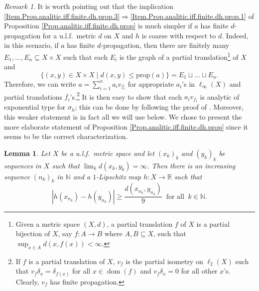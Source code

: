 \documentclass[11pt]{amsart}
\newcommand{\R}{\mathbb{R}}
\newcommand{\N}{\mathbb{N}}
\numberwithin{equation}{section}
\newtheorem{lemma}[theorem]{Lemma}
\theoremstyle{definition}
\theoremstyle{remark}
\newtheorem{remark}[theorem]{Remark}
\DeclareMathOperator{\dom}{dom}
\begin{document}
\begin{remark}
It is worth pointing out that the implication \eqref{Item.Prop.analitic.iff.finite.dh.prop.3}$\Rightarrow$\eqref{Item.Prop.analitic.iff.finite.dh.prop.1}  of Proposition \ref{Prop.analitic.iff.finite.dh.prop} is much simpler if $a$ has finite $d$-propagation for a u.l.f.\ metric $d$ on $X$ and $h$ is coarse with respect to $d$. Indeed, in this scenario, if $a$ has finite $d$-propagation, then there are finitely many $E_1,\ldots, E_n\subseteq X\times X$ such that each $E_i$ is the graph of a partial translation\footnote{Given a metric space $(X,d)$, a partial translation $f$ of $X$ is a partial bijection of $X$, say $f\colon A\to B$ where $A,B\subseteq X$,  such that $\sup_{x\in A}d(x,f(x))<\infty$.} of $X$ and
\[\{(x,y)\in X\times X\mid d(x,y)\leq \mathrm{prop}(a)\}=E_1\sqcup\ldots\sqcup E_n.\]
Therefore, we can write $a=\sum_{i=1}^na_iv_{f_i}$ for  appropriate $a_i$'s in $\ell_\infty(X)$ and partial translations $f_i$'s.\footnote{If $f$ is a partial translation of $X$, $v_f$ is the partial isometry on $\ell_2(X)$ such that $v_f\delta_x=\delta_{f(x)}$ for all $x\in \dom(f)$ and $v_f\delta_x=0$ for all other $x$'s. Clearly, $v_f$ has finite propagation.} It is then easy to show that each $a_iv_{f_i}$ is analytic of exponential type for $\sigma_h$; this can be done by following the proof of    \cite[Proposition 1.4(2)]{BragaExel2023}.  Moreover, this weaker statement is in fact all we will use below. We chose to present the more elaborate statement of Proposition \ref{Prop.analitic.iff.finite.dh.prop}  since it seems to be the correct characterization.
\end{remark}

 
\begin{lemma}\label{lem:detect} Let $X$ be a u.l.f.\ metric space and let $(x_k)_k$ and $(y_k)_k$ be sequences in $X$ such that $\lim_kd(x_k,y_k)=\infty$.  Then there is an increasing sequence $(n_k)_k$ in $\N$ and a $1$-Lipschitz map $h\colon X\to\R$ such that \[|h(x_{n_{k}}) -h(y_{n_{k}})|\geq \frac{d(x_{n_k},y_{n_k})}{9}\ \text{ for all }\ k\in\N.\]
\end{lemma}
\end{document}
